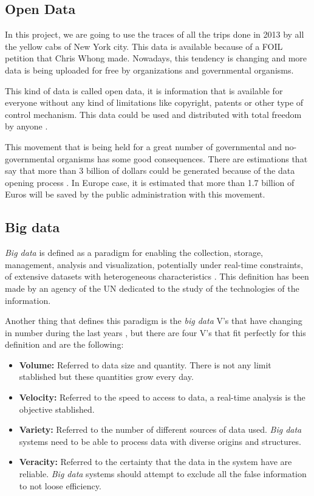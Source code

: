 \subsection{Open Data} 
In this project, we are going to use the traces of all the trips done in 2013 by all the yellow cabs of New York city. This data is available because of a \Gls{FOIL} petition that Chris Whong made. Nowadays, this tendency is changing and more data is being uploaded for free by organizations and governmental organisms.

This kind of data is called open data, it is information that is available for everyone without any kind of limitations like copyright, patents or other type of control mechanism. This data could be used and distributed with total freedom by anyone \cite{opendata}.

This movement that is being held for a great number of governmental and no-governmental organisms \cite{onudata} \cite{datosMadrid} has some good consequences. There are estimations that say that more than 3 billion of dollars could be generated because of the data opening process \cite{revenueOpenData}. In Europe case, it is estimated that more than 1.7 billion of Euros will be saved by the public administration with this movement.

\subsection{Big data}
\textit{Big data} is defined as a paradigm for enabling the collection, storage, management, analysis and visualization, potentially under real-time constraints, of extensive datasets with heterogeneous characteristics \cite{estandar}. This definition has been made by an agency of the UN dedicated to the study of the technologies of the information.

Another thing that defines this paradigm is the \textit{big data} V’s that have changing in number during the last years \cite{ayuso} \cite{4v} \cite{monse} \cite{soriano}, but there are four V’s that fit perfectly for this definition and are the following:

\begin{itemize}
\item \textbf{Volume:} Referred to data size and quantity. There is not any limit stablished but these quantities grow every day.
\item \textbf{Velocity:} Referred to the speed to access to data, a real-time analysis is the objective stablished.
\item \textbf{Variety:} Referred to the number of different sources of data used. \textit{Big data} systems need to be able to process data with diverse origins and structures.
\item \textbf{Veracity:} Referred to the certainty that the data in the system have are reliable. \textit{Big data} systems should attempt to exclude all the false information to not loose efficiency. 
\end{itemize}

